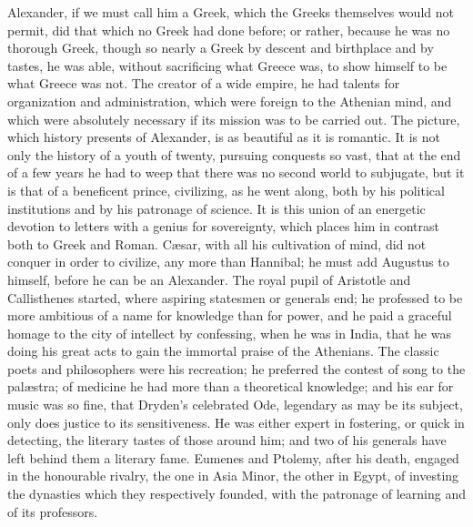 Alexander, if we must call him a Greek, which the Greeks themselves
would not permit, did that which no Greek had done before; or rather,
because he was no thorough Greek, though so nearly a Greek by descent
and birthplace and by tastes, he was able, without sacrificing what
Greece was, to show himself to be what Greece was not. The creator of
a wide empire, he had talents for organization and administration,
which were foreign to the Athenian mind, and which were absolutely
necessary if its mission was to be carried out. The picture, which
history presents of Alexander, is as beautiful as it is romantic. It
is not only the history of a youth of twenty, pursuing conquests so
vast, that at the end of a few years he had to weep that there was no
second world to subjugate, but it is that of a beneficent prince,
civilizing, as he went along, both by his political institutions and
by his patronage of science. It is this union of an energetic devotion
to letters with a genius for sovereignty, which places him in contrast
both to Greek and Roman. Cæsar, with all his cultivation of mind, did
not conquer in order to civilize, any more than Hannibal; he must add
Augustus to himself, before he can be an Alexander. The royal pupil of
Aristotle and Callisthenes started, where aspiring statesmen or
generals end; he professed to be more ambitious of a name for
knowledge than for power, and he paid a graceful homage to the
city of intellect by confessing, when he was in India, that he was
doing his great acts to gain the immortal praise of the Athenians. The
classic poets and philosophers were his recreation; he preferred the
contest of song to the palæstra; of medicine he had more than a
theoretical knowledge; and his ear for music was so fine, that Dryden's
celebrated Ode, legendary as may be its subject, only does justice to
its sensitiveness. He was either expert in fostering, or quick in
detecting, the literary tastes of those around him; and two of his
generals have left behind them a literary fame. Eumenes and Ptolemy,
after his death, engaged in the honourable rivalry, the one in Asia
Minor, the other in Egypt, of investing the dynasties which they
respectively founded, with the patronage of learning and of its
professors.

